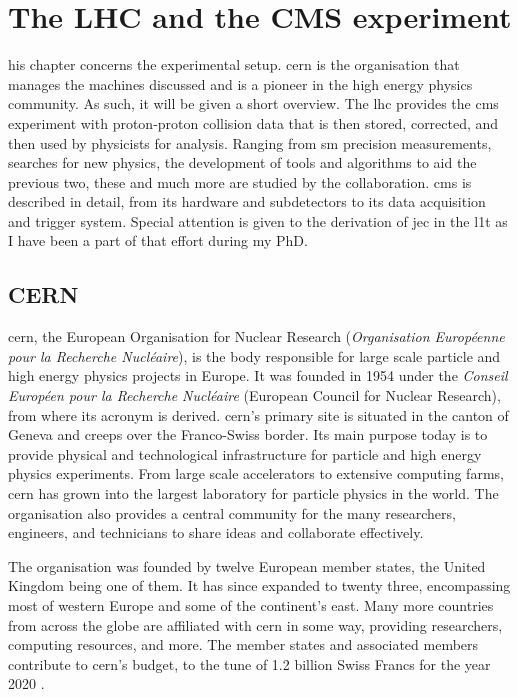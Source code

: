 \chapter{The LHC and the CMS experiment}
\label{chap:detector}

his chapter concerns the experimental setup. \acrshort{cern} is the organisation that manages the machines discussed and is a pioneer in the high energy physics community. As such, it will be given a short overview. The \acrlong{lhc} provides the \acrshort{cms} experiment with proton-proton collision data that is then stored, corrected, and then used by physicists for analysis. Ranging from \acrlong{sm} precision measurements, searches for new physics, the development of tools and algorithms to aid the previous two, these and much more are studied by the collaboration. \acrshort{cms} is described in detail, from its hardware and subdetectors to its data acquisition and trigger system. Special attention is given to the derivation of \acrfull{jec} in the \acrfull{l1t} as I have been a part of that effort during my PhD.




\section{CERN}
\label{sec:detector_cern}

\acrshort{cern}, the European Organisation for Nuclear Research (\emph{Organisation Europ\'{e}enne pour la Recherche Nucl\'{e}aire}), is the body responsible for large scale particle and high energy physics projects in Europe. It was founded in 1954 under the \emph{Conseil Europ\'{e}en pour la Recherche Nucl\'{e}aire} (European Council for Nuclear Research), from where its acronym is derived. \acrshort{cern}'s primary site is situated in the canton of Geneva and creeps over the Franco-Swiss border. Its main purpose today is to provide physical and technological infrastructure for particle and high energy physics experiments. From large scale accelerators to extensive computing farms, \acrshort{cern} has grown into the largest laboratory for particle physics in the world. The organisation also provides a central community for the many researchers, engineers, and technicians to share ideas and collaborate effectively.

The organisation was founded by twelve European member states, the United Kingdom being one of them. It has since expanded to twenty three, encompassing most of western Europe and some of the continent's east. Many more countries from across the globe are affiliated with \acrshort{cern} in some way, providing researchers, computing resources, and more. The member states and associated members contribute to \acrshort{cern}'s budget, to the tune of 1.2 billion Swiss Francs for the year 2020 \cite{cern_budget_2020}.


